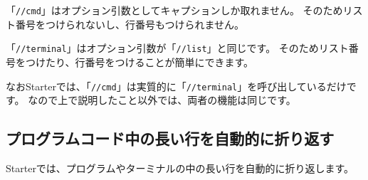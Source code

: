 \begin{starteritemize}
\item 「\texttt{//cmd}」はオプション引数としてキャプションしか取れません。
   そのためリスト番号をつけられないし、行番号もつけられません。
\end{starteritemize}

\begin{starterprogram}\end{starterprogram}
\noindent
{}

\starterresult
{}
\begin{starterterminal}\end{starterterminal}
\endstarterresult

\begin{starteritemize}
\item 「\texttt{//terminal}」はオプション引数が「\texttt{//list}」と同じです。
   そのためリスト番号をつけたり、行番号をつけることが簡単にできます。
\end{starteritemize}

\begin{starterprogram}\end{starterprogram}
\noindent
{}

\starterresult
{}
\label{id6789}
\begin{starterterminal}
\end{starterterminal}
\endstarterresult

なおStarterでは、「\texttt{//cmd}」は実質的に「\texttt{//terminal}」を呼び出しているだけです。
なので上で説明したこと以外では、両者の機能は同じです。

\subsection*{プログラムコード中の長い行を自動的に折り返す}
\label{sec:1-1-7}

Starterでは、プログラムやターミナルの中の長い行を自動的に折り返します。

